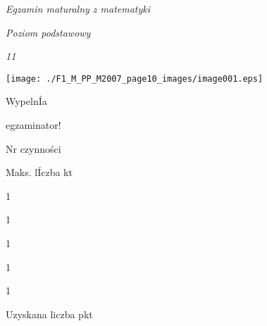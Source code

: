 \documentclass[a4paper,12pt]{article}
\begin{document}
{\it Egzamin maturalny z matematyki}

{\it Poziom podstawowy}

{\it 11}
\begin{center}
\texttt{[image: ./F1\_M\_PP\_M2007\_page10\_images/image001.eps]}
\end{center}
WypelnÍa

egzaminator!

Nr czynności

Maks. lÍczba kt

1

1

1

1

1

Uzyskana liczba pkt
\end{document}
